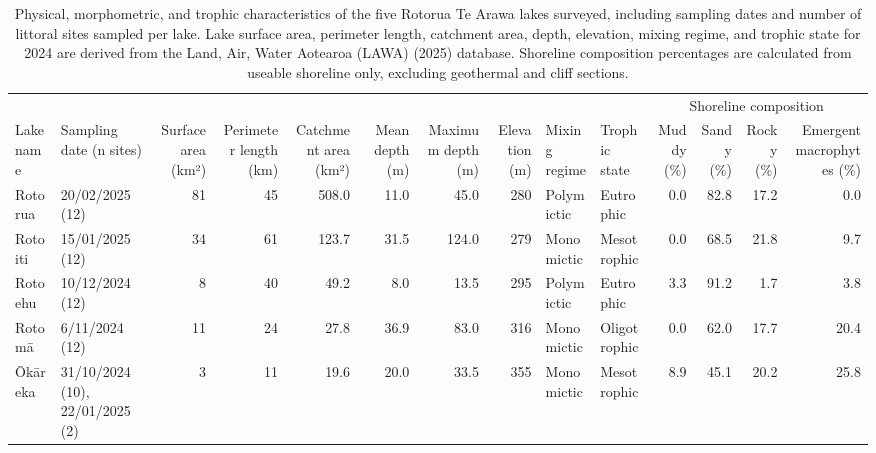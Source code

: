 \documentclass[
  12pt,
  a4paper,
  oneside]{scrbook}
\begin{document}
\begin{landscape}

\begin{longtable}[t]{llrrrrrrllrrrr}

\caption{\label{tbl-lake-overview}Physical, morphometric, and trophic
characteristics of the five Rotorua Te Arawa lakes surveyed, including
sampling dates and number of littoral sites sampled per lake. Lake
surface area, perimeter length, catchment area, depth, elevation, mixing
regime, and trophic state for 2024 are derived from the Land, Air, Water
Aotearoa (LAWA) (2025) database. Shoreline composition percentages are
calculated from useable shoreline only, excluding geothermal and cliff
sections.}

\tabularnewline

\toprule
\multicolumn{10}{c}{ } & \multicolumn{4}{c}{Shoreline composition} \\
\cmidrule(l{3pt}r{3pt}){11-14}
Lake name & Sampling date (n sites) & Surface area (km²) & Perimeter length (km) & Catchment area (km²) & Mean depth (m) & Maximum depth (m) & Elevation (m) & Mixing regime & Trophic state & Muddy (\%) & Sandy (\%) & Rocky (\%) & Emergent macrophytes (\%)\\
\midrule
Rotorua & 20/02/2025 (12) & 81 & 45 & 508.0 & 11.0 & 45.0 & 280 & Polymictic & Eutrophic & 0.0 & 82.8 & 17.2 & 0.0\\
Rotoiti & 15/01/2025 (12) & 34 & 61 & 123.7 & 31.5 & 124.0 & 279 & Monomictic & Mesotrophic & 0.0 & 68.5 & 21.8 & 9.7\\
Rotoehu & 10/12/2024 (12) & 8 & 40 & 49.2 & 8.0 & 13.5 & 295 & Polymictic & Eutrophic & 3.3 & 91.2 & 1.7 & 3.8\\
Rotomā & 6/11/2024 (12) & 11 & 24 & 27.8 & 36.9 & 83.0 & 316 & Monomictic & Oligotrophic & 0.0 & 62.0 & 17.7 & 20.4\\
Ōkāreka & 31/10/2024 (10), 22/01/2025 (2) & 3 & 11 & 19.6 & 20.0 & 33.5 & 355 & Monomictic & Mesotrophic & 8.9 & 45.1 & 20.2 & 25.8\\
\bottomrule

\end{longtable}

\end{landscape}
\end{document}

